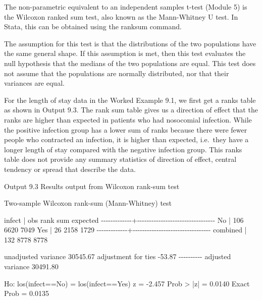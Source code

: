 \documentclass[
]{memoir}
\newenvironment{Shaded}{\begin{snugshade}}{\end{snugshade}}
\newcommand{\NormalTok}[1]{#1}
\begin{document}
The non-parametric equivalent to an independent samples t-test (Module 5) is the Wilcoxon ranked sum test, also known as the Mann-Whitney U test. In Stata, this can be obtained using the ranksum command.

The assumption for this test is that the distributions of the two populations have the same general shape. If this assumption is met, then this test evaluates the null hypothesis that the medians of the two populations are equal. This test does not assume that the populations are normally distributed, nor that their variances are equal.

For the length of stay data in the Worked Example 9.1, we first get a ranks table as shown in Output 9.3. The rank sum table gives us a direction of effect that the ranks are higher than expected in patients who had nosocomial infection. While the positive infection group has a lower sum of ranks because there were fewer people who contracted an infection, it is higher than expected, i.e.~they have a longer length of stay compared with the negative infection group. This ranks table does not provide any summary statistics of direction of effect, central tendency or spread that describe the data.

Output 9.3 Results output from Wilcoxon rank-sum test

\begin{Shaded}
\begin{Highlighting}[]
\NormalTok{Two{-}sample Wilcoxon rank{-}sum (Mann{-}Whitney) test}

\NormalTok{      infect |      obs    rank sum    expected}
\NormalTok{{-}{-}{-}{-}{-}{-}{-}{-}{-}{-}{-}{-}{-}+{-}{-}{-}{-}{-}{-}{-}{-}{-}{-}{-}{-}{-}{-}{-}{-}{-}{-}{-}{-}{-}{-}{-}{-}{-}{-}{-}{-}{-}{-}{-}{-}{-}}
\NormalTok{          No |      106        6620        7049}
\NormalTok{         Yes |       26        2158        1729}
\NormalTok{{-}{-}{-}{-}{-}{-}{-}{-}{-}{-}{-}{-}{-}+{-}{-}{-}{-}{-}{-}{-}{-}{-}{-}{-}{-}{-}{-}{-}{-}{-}{-}{-}{-}{-}{-}{-}{-}{-}{-}{-}{-}{-}{-}{-}{-}{-}}
\NormalTok{    combined |      132        8778        8778}

\NormalTok{unadjusted variance    30545.67}
\NormalTok{adjustment for ties      {-}53.87}
\NormalTok{                     {-}{-}{-}{-}{-}{-}{-}{-}{-}{-}}
\NormalTok{adjusted variance      30491.80}

\NormalTok{Ho: los(infect==No) = los(infect==Yes)}
\NormalTok{             z =  {-}2.457}
\NormalTok{    Prob \textgreater{} |z| =   0.0140}
\NormalTok{    Exact Prob =   0.0135}
\end{Highlighting}
\end{Shaded}
\end{document}

